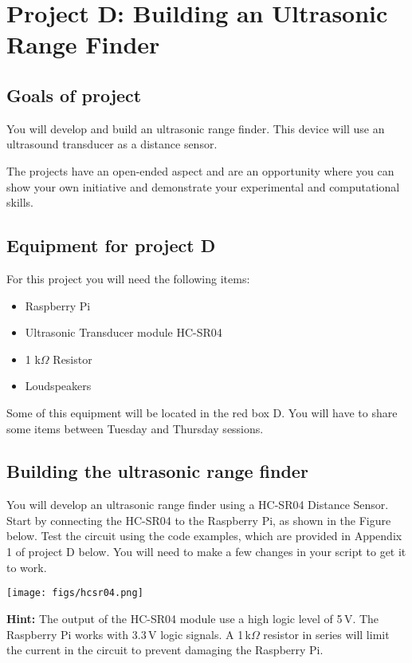  
\newpage
\section{Project D: Building an Ultrasonic Range Finder}

\subsection{Goals of project}

You will develop and build an ultrasonic range finder.
This device will use an ultrasound transducer as a distance sensor. 

The projects have an open-ended aspect and are an opportunity where you can show your own initiative and demonstrate your experimental and computational skills. 

\subsection{Equipment for project D}

For this project you will need the following items:
\begin{itemize}
\item Raspberry Pi
\item Ultrasonic Transducer module HC-SR04
\item 1 k$\Omega$ Resistor
\item Loudspeakers
\end{itemize}
Some of this equipment will be located in the red box D.
You will have to share some items between Tuesday and Thursday sessions. 


\subsection{Building the ultrasonic range finder}
 
You will develop an ultrasonic range finder using a HC-SR04 Distance Sensor. 
Start by connecting the HC-SR04 to the Raspberry Pi, as shown in the Figure below.
Test the circuit using the code examples, which are provided in Appendix 1 of project D below. 
You will need to make a few changes in your script to get it to work.

\begin{center}                                        
 {\texttt{[image: figs/hcsr04.png]}}
 \end{center}


{\bf Hint:} The output of the HC-SR04 module use a high logic level of 5\,V.
The Raspberry Pi works with 3.3\,V logic signals.
A 1\,k$\Omega$ resistor in series will limit the current in the circuit to prevent damaging the Raspberry Pi.
 
